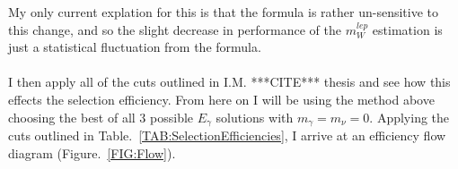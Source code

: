 My only current explation for this is that the formula is rather un-sensitive to this change, and so the slight decrease in performance of the ${m}_{W}^{lep}$ estimation is just a statistical fluctuation from the formula.
\\\\
I then apply all of the cuts outlined in I.M. ***CITE*** thesis and see how this effects the selection efficiency. From here on I will be using the method above choosing the best of all 3 possible ${E}_{\gamma}$ solutions with ${m}_{\gamma}= {m}_{\nu} = 0$. Applying the cuts outlined in Table.~\ref{TAB:SelectionEfficiencies}, I arrive at an efficiency flow diagram (Figure.~\ref{FIG:Flow}).
\\\\
  \begin{table}[!]
    \centering
    \caption{
      Selection efficiency of sequantially applied cuts. Where the post ISR correction ${m}_{W}^{lep}$ was calculated using all 3 possible ${E}_{\gamma}$ solutions. (*) Means my and Ivan's cuts differ slightly
    }
    \label{TAB:SelectionEfficiencies}
\end{table}
